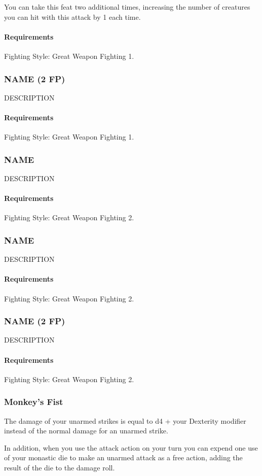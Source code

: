     You can take this feat two additional times, increasing the number of creatures you can hit with this attack by 1 each time.
    \paragraph{Requirements} Fighting Style: Great Weapon Fighting 1.
\subsubsection{NAME (2 FP)} \label{feat::name}
    DESCRIPTION
    \paragraph{Requirements} Fighting Style: Great Weapon Fighting 1.
\subsubsection{NAME} \label{feat::name}
    DESCRIPTION
    \paragraph{Requirements} Fighting Style: Great Weapon Fighting 2.
\subsubsection{NAME} \label{feat::name}
    DESCRIPTION
    \paragraph{Requirements} Fighting Style: Great Weapon Fighting 2.
\subsubsection{NAME (2 FP)} \label{feat::name}
    DESCRIPTION
    \paragraph{Requirements} Fighting Style: Great Weapon Fighting 2.
\subsubsection{Monkey's Fist} \label{feat::monkeysfist}
    The damage of your unarmed strikes is equal to d4 + your Dexterity modifier instead of the normal damage for an unarmed strike.

    In addition, when you use the attack action on your turn you can expend one use of your monastic die to make an unarmed attack as a free action, adding the result of the die to the damage roll.
